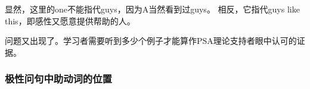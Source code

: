 \z
显然，这里的one不能指代guys，因为A当然看到过guys。
相反，它指代guys like this，即感性又愿意提供帮助的人。

问题又出现了。学习者需要听到多少个例子才能算作PSA理论支持者眼中认可的证据。

\subsubsection{极性问句中助动词的位置}
\label{Abschnitt-Hilfsverbumstellung}

